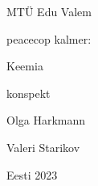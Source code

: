 \begin{titlepage}
\par{MTÜ Edu Valem}
\vspace{0.3\textheight}
\par{peacecop kalmer:}
\LARGE
\par{Keemia}
\normalsize
\par{konspekt}
\vspace{0.3\textheight}
\begin{flushright}
\par{Olga Harkmann}
\par{Valeri Starikov}
\end{flushright}
\vfill
Eesti
\hfill
2023
\end{titlepage}
